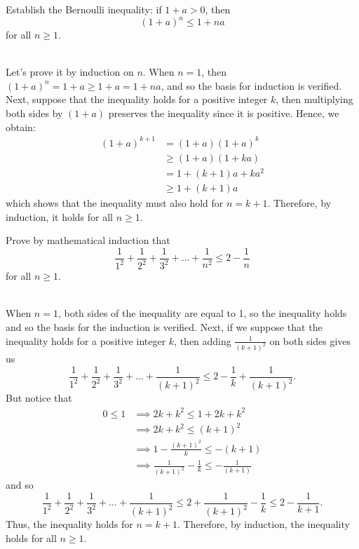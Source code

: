 \begin{exercise}
    Establish the Bernoulli inequality: if $1 + a > 0$, then 
    $$(1 + a)^n \leq 1 + na$$
    for all $n \geq 1$. \\
\end{exercise}

\begin{solution}
    \\ Let's prove it by induction on $n$. When $n = 1$, then $(1 + a)^n = 1 + a \geq 1 + a = 1 + na$, and so the basis for induction is verified. Next, suppose that the inequality holds for a positive integer $k$, then multiplying both sides by $(1+a)$ preserves the inequality since it is positive. Hence, we obtain:
    \begin{align*}
        (1+a)^{k+1} &= (1+a)(1+a)^k \\
        &\geq (1+a)(1+ka) \\
        &= 1 + (k+1)a + ka^2 \\
        &\geq 1 + (k+1)a
    \end{align*}
    which shows that the inequality must also hold for $n = k+1$. Therefore, by induction, it holds for all $n \geq 1$.  \\
\end{solution}

\begin{exercise}
    Prove by mathematical induction that
    $$\frac{1}{1^2} + \frac{1}{2^2} + \frac{1}{3^2} + \dots + \frac{1}{n^2} \leq 2 - \frac{1}{n}$$
    for all $n \geq 1$. \\
\end{exercise}

\begin{solution}
    \\ When $n = 1$, both sides of the inequality are equal to 1, so the inequality holds and so the basis for the induction is verified. Next, if we suppose that the inequality holds for a positive integer $k$, then adding $\frac{1}{(k+1)^2}$ on both sides gives us
    $$\frac{1}{1^2} + \frac{1}{2^2} + \frac{1}{3^2} + \dots + \frac{1}{(k+1)^2} \leq 2 - \frac{1}{k} + \frac{1}{(k+1)^2}.$$
    But notice that
    \begin{align*}
        0 \leq 1 &\implies 2k + k^2 \leq 1 + 2k + k^2 \\
        &\implies 2k + k^2 \leq (k+1)^2 \\
        &\implies 1 - \frac{(k+1)^2}{k} \leq -(k+1) \\
        &\implies \frac{1}{(k+1)^2} - \frac{1}{k} \leq - \frac{1}{(k+1)}
    \end{align*}
    and so 
    $$\frac{1}{1^2} + \frac{1}{2^2} + \frac{1}{3^2} + \dots + \frac{1}{(k+1)^2} \leq 2 + \frac{1}{(k+1)^2} - \frac{1}{k} \leq 2 - \frac{1}{k+1}.$$
    Thus, the inequality holds for $n = k+1$. Therefore, by induction, the inequality holds for all $n \geq 1$. 
\end{solution}